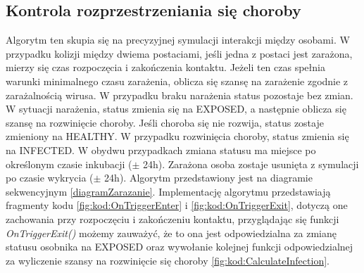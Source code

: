 \subsection{Kontrola rozprzestrzeniania się choroby}
Algorytm ten skupia się na precyzyjnej symulacji interakcji między osobami. W przypadku kolizji między dwiema postaciami, jeśli jedna z postaci jest zarażona, mierzy się czas rozpoczęcia i zakończenia kontaktu. Jeżeli ten czas spełnia warunki minimalnego czasu zarażenia, oblicza się szansę na zarażenie zgodnie z zarażalnością wirusa. W przypadku braku narażenia status pozostaje bez zmian. W sytuacji narażenia, status zmienia się na EXPOSED, a następnie oblicza się szansę na rozwinięcie choroby. Jeśli choroba się nie rozwija, status zostaje zmieniony na HEALTHY. W przypadku rozwinięcia choroby, status zmienia się na INFECTED. W obydwu przypadkach zmiana statusu ma miejsce po określonym czasie inkubacji ($\pm$ 24h). Zarażona osoba zostaje usunięta z symulacji po czasie wykrycia ($\pm$ 24h). Algorytm przedstawiony jest na diagramie sekwencyjnym \ref{diagramZarazanie}. Implementację algorytmu przedstawiają fragmenty kodu \ref{fig:kod:OnTriggerEnter} i \ref{fig:kod:OnTriggerExit}, dotyczą one zachowania przy rozpoczęciu i zakończeniu kontaktu, przyglądając się funkcji \textit{OnTriggerExit()} możemy zauważyć, że to ona jest odpowiedzialna za zmianę statusu osobnika na EXPOSED oraz wywołanie kolejnej funkcji odpowiedzialnej za wyliczenie szansy na rozwinięcie się choroby \ref{fig:kod:CalculateInfection}.

